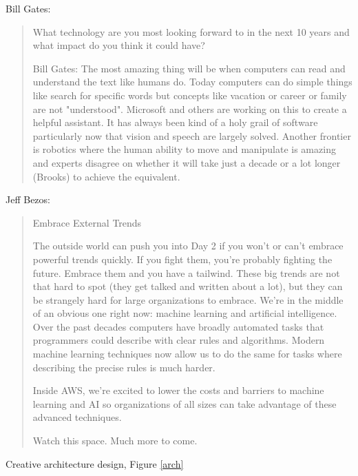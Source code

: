 \documentclass[english]{article}
\begin{document}
Bill Gates:

\begin{quote}
What technology are you most looking forward to in the next 10 years and what impact do you think it could have?

Bill Gates:
The most amazing thing will be when computers can read and understand the text like humans do. Today computers can do simple things like search for specific words but concepts like vacation or career or family are not "understood". Microsoft and others are working on this to create a helpful assistant. It has always been kind of a holy grail of software particularly now that vision and speech are largely solved. Another frontier is robotics where the human ability to move and manipulate is amazing and experts disagree on whether it will take just a decade or a lot longer (Brooks) to achieve the equivalent.
\end{quote}

Jeff Bezos:

\begin{quote}
Embrace External Trends

The outside world can push you into Day 2 if you won't or can't embrace powerful trends quickly. If you fight them, you're probably fighting the future.
Embrace them and you have a tailwind.
These big trends are not that hard to spot (they get talked and written about a lot), but they can be strangely hard for large organizations to embrace. We're in
the middle of an obvious one right now: machine learning and artificial intelligence.
Over the past decades computers have broadly automated tasks that programmers could describe with clear rules and algorithms. Modern machine learning
techniques now allow us to do the same for tasks where describing the precise rules is much harder.


Inside AWS, we're excited to lower the costs and barriers to machine learning and AI so organizations of all sizes can take advantage of these advanced techniques.

Watch this space. Much more to come.
\end{quote}

\item Creative architecture design, Figure \ref{arch}
\end{document}

